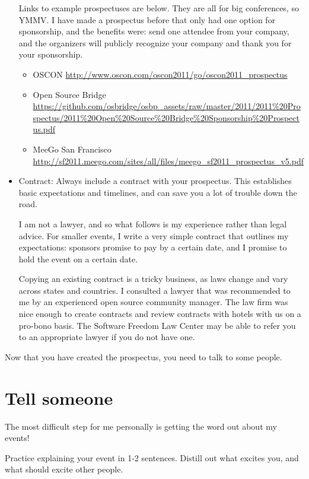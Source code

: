 \begin{itemize}
Links to example prospectuses are below. They are all for big conferences, so
YMMV. I have made a prospectus before that
only had one option for sponsorship, and the benefits were: send one attendee
from your company, and the organizers will publicly recognize your company and 
thank you for your sponsorship.
\begin{itemize}
\item OSCON \url{http://www.oscon.com/oscon2011/go/oscon2011_prospectus}
\item Open Source Bridge
\url{https://github.com/osbridge/osbp_assets/raw/master/2011/2011\%20Prospectus/2011\%20Open\%20Source\%20Bridge\%20Sponsorship\%20Prospectus.pdf}
\item MeeGo San Francisco
\url{http://sf2011.meego.com/sites/all/files/meego_sf2011_prospectus_v5.pdf}
\end{itemize}

\item Contract:
Always include a contract with your prospectus. This establishes basic
expectations and timelines, and can save you a lot of trouble down the road.

I am not a lawyer, and so what follows is my experience rather than legal
advice. For smaller events, I write a very simple contract that outlines my
expectations: sponsors promise to pay by a certain date, and I promise to hold
the event on a certain date.

Copying an existing contract is a tricky business, as laws change and vary
across states and countries. I consulted a lawyer that was recommended to me by
an experienced open source community manager. The law firm was nice enough to
create contracts and review contracts with hotels with us on a pro-bono basis.
The Software Freedom Law Center may be able to refer you to an appropriate
lawyer if you do not have one.
\end{itemize}

Now that you have created the prospectus, you need to talk to some people.

\section*{Tell someone}
The most difficult step for me personally is getting the word out about my
events! 

Practice explaining your event in 1-2 sentences. Distill out what excites you,
and what should excite other people.

